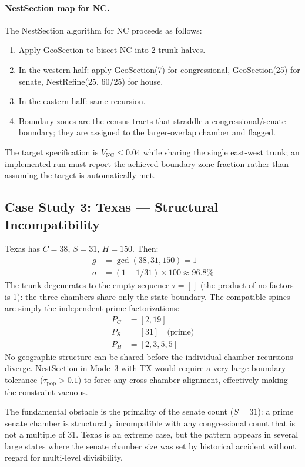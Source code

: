 \paragraph{NestSection map for NC.}
The NestSection algorithm for NC proceeds as follows:
\begin{enumerate}
  \item Apply GeoSection to bisect NC into 2 trunk halves.
  \item In the western half: apply GeoSection(7) for congressional, GeoSection(25)
        for senate, NestRefine(25, 60/25) for house.
  \item In the eastern half: same recursion.
  \item Boundary zones are the census tracts that straddle a congressional/senate
        boundary; they are assigned to the larger-overlap chamber and flagged.
\end{enumerate}
The target specification is $V_\text{NC} \leq 0.04$ while sharing the single
east-west trunk; an implemented run must report the achieved boundary-zone
fraction rather than assuming the target is automatically met.

\subsection{Case Study 3: Texas --- Structural Incompatibility}

Texas has $C = 38$, $S = 31$, $H = 150$.  Then:
\begin{align*}
  g &= \gcd(38, 31, 150) = 1 \\
  \sigma &= (1 - 1/31) \times 100 \approx 96.8\%
\end{align*}
The trunk degenerates to the empty sequence $\tau = []$ (the product of no
factors is 1): the three chambers share only the state boundary.  The
compatible spines are simply the independent prime factorizations:
\begin{align*}
  P_C &= [2, 19] \\
  P_S &= [31] \quad\text{(prime)} \\
  P_H &= [2, 3, 5, 5]
\end{align*}
No geographic structure can be shared before the individual chamber
recursions diverge.  NestSection in Mode~3 with TX would require a very
large boundary tolerance ($\tau_\text{pop} > 0.1$) to force any
cross-chamber alignment, effectively making the constraint vacuous.

The fundamental obstacle is the primality of the senate count ($S = 31$):
a prime senate chamber is structurally incompatible with any congressional
count that is not a multiple of 31.  Texas is an extreme case, but the
pattern appears in several large states where the senate chamber size was
set by historical accident without regard for multi-level divisibility.

